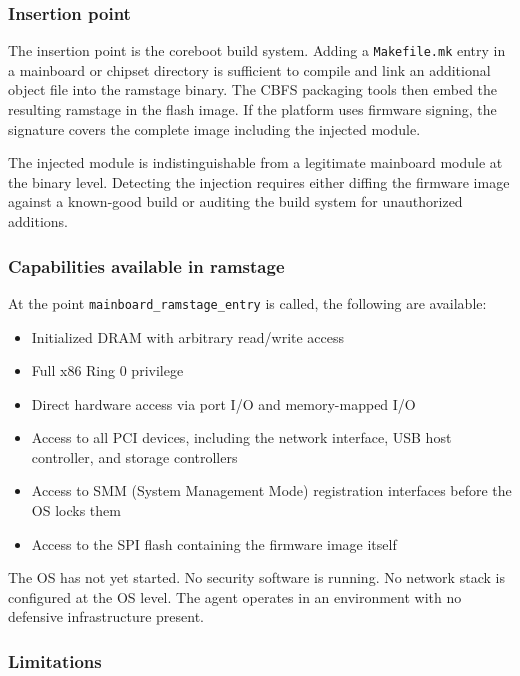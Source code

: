 \documentclass[11pt,a4paper]{article}
\begin{document}
\subsubsection{Insertion point}

The insertion point is the coreboot build system. Adding a \texttt{Makefile.mk} entry in a mainboard or chipset directory is sufficient to compile and link an additional object file into the ramstage binary. The CBFS packaging tools then embed the resulting ramstage in the flash image. If the platform uses firmware signing, the signature covers the complete image including the injected module.

The injected module is indistinguishable from a legitimate mainboard module at the binary level. Detecting the injection requires either diffing the firmware image against a known-good build or auditing the build system for unauthorized additions.

\subsubsection{Capabilities available in ramstage}

At the point \texttt{mainboard\_ramstage\_entry} is called, the following are available:

\begin{itemize}[noitemsep]
\item Initialized DRAM with arbitrary read/write access
\item Full x86 Ring 0 privilege
\item Direct hardware access via port I/O and memory-mapped I/O
\item Access to all PCI devices, including the network interface, USB host controller, and storage controllers
\item Access to SMM (System Management Mode) registration interfaces before the OS locks them
\item Access to the SPI flash containing the firmware image itself
\end{itemize}

The OS has not yet started. No security software is running. No network stack is configured at the OS level. The agent operates in an environment with no defensive infrastructure present.

\subsubsection{Limitations}
\end{document}
